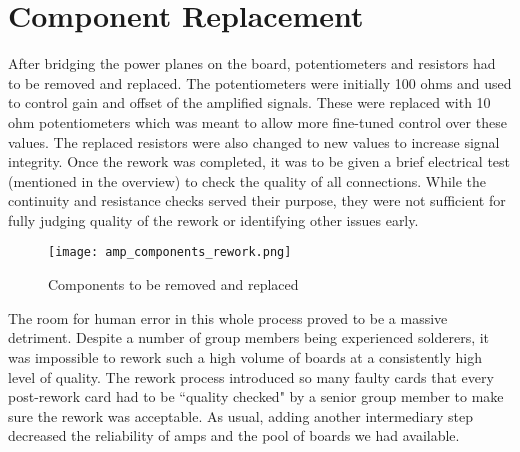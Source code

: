 \section{Component Replacement}
After bridging the power planes on the board, potentiometers and resistors had to be removed and replaced. The potentiometers were initially 100 ohms and used to control gain and offset of the amplified signals. These were replaced with 10 ohm potentiometers which was meant to allow more fine-tuned control over these values. The replaced resistors were also changed to new values to increase signal integrity. Once the rework was completed, it was to be given a brief electrical test (mentioned in the overview) to check the quality of all connections. While the continuity and resistance checks served their purpose, they were not sufficient for fully judging quality of the rework or identifying other issues early. \par
\begin{figure}[!htb]
	\texttt{[image: amp\_components\_rework.png]}
	\centering
	\caption{Components to be removed and replaced}
	\centering
\end{figure}
The room for human error in this whole process proved to be a massive detriment. Despite a number of group members being experienced solderers, it was impossible to rework such a high volume of boards at a consistently high level of quality. The rework process introduced so many faulty cards that every post-rework card had to be ``quality checked" by a senior group member to make sure the rework was acceptable. As usual, adding another intermediary step decreased the reliability of amps and the pool of boards we had available.

